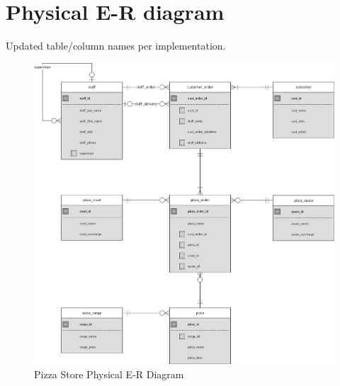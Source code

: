 \newpage
\section{Physical E-R diagram}

Updated table/column names per implementation.

\begin{figure}[H]
\centering
\caption{Pizza Store Physical E-R Diagram}
\includegraphics[scale=0.45]{./img/CSG1207_A1_PONCE_TASK_4_ADVPER_PIZZA.pdf}
\end{figure}
